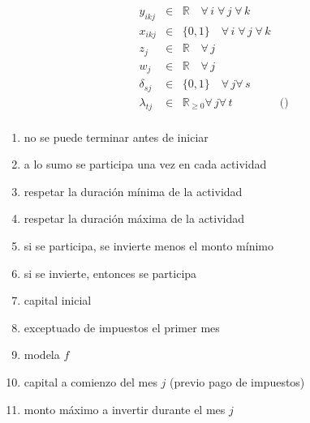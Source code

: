 \documentclass{article}
\begin{document}
\[\begin{array}{rrcll}
     & y_{ikj} & \in & \mathbb{R} \quad \forall\,i\;\forall\,j\;\forall\,k & \\
     & x_{ikj} & \in & \{0,1\} \quad \forall\,i\;\forall\,j\;\forall\,k & \\
     & z_j & \in & \mathbb{R} \quad \forall\,j &  \\
     & w_j & \in & \mathbb{R} \quad \forall\,j &  \\
     & \delta_{sj} & \in & \{0,1\} \quad \forall\,j\forall\, s & \\
     & \lambda_{tj} & \in & \mathbb{R}_{\geq 0} \forall\,j\forall\,t & \text{()} \\
\end{array}
\]

\begin{enumerate}[(1)]
    \item no se puede terminar antes de iniciar
    \item a lo sumo se participa una vez en cada actividad
    \item respetar la duración mínima de la actividad
    \item respetar la duración máxima de la actividad
    \item si se participa, se invierte menos el monto mínimo
    \item si se invierte, entonces se participa
    \item capital inicial
    \item exceptuado de impuestos el primer mes
    \item modela $f$
    \item capital a comienzo del mes $j$ (previo pago de impuestos)
    \item monto máximo a invertir durante el mes $j$
\end{enumerate}
\end{document}
